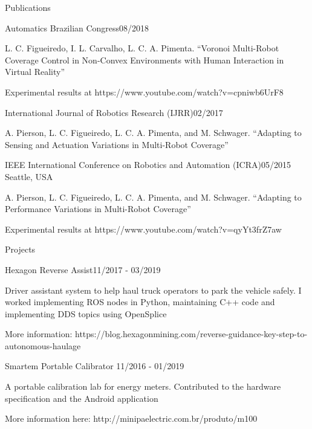 \documentclass[14pt, a4paper]{resume} %
\begin{document}
\begin{rSection}{Publications}
	
\begin{rSubsection}{Automatics Brazilian Congress}{08/2018}{}{}
	
\item L. C. Figueiredo, I. L. Carvalho, L. C. A. Pimenta. ``Voronoi Multi-Robot Coverage Control in Non-Convex Environments with Human Interaction in Virtual Reality''
\item Experimental results at https://www.youtube.com/watch?v=cpniwb6UrF8

\end{rSubsection}	
	
\begin{rSubsection}{International Journal of Robotics Research (IJRR)}{02/2017}{}{}
	
\item A. Pierson, L. C. Figueiredo, L. C. A. Pimenta, and M. Schwager. ``Adapting to Sensing and Actuation Variations in Multi-Robot Coverage''

\end{rSubsection}

\begin{rSubsection}{IEEE International Conference on Robotics and Automation (ICRA)}{05/2015}{}{ \normalfont Seattle, USA}

\item A. Pierson, L. C. Figueiredo, L. C. A. Pimenta, and M. Schwager. ``Adapting to Performance Variations in Multi-Robot Coverage''
\item Experimental results at https://www.youtube.com/watch?v=qyYt3frZ7aw


\end{rSubsection}


\end{rSection}

\begin{rSection}{Projects}
	\begin{rSubsection}{Hexagon Reverse Assist}{11/2017 - 03/2019}{}{}
		\item Driver assistant system to help haul truck operators to park the vehicle safely. I worked implementing ROS nodes in Python, maintaining C++ code and implementing DDS topics using OpenSplice
		\item More information: https://blog.hexagonmining.com/reverse-guidance-key-step-to-autonomous-haulage
	\end{rSubsection}
	
	
	\begin{rSubsection}{Smartem Portable Calibrator	}{11/2016 - 01/2019}{}{}
		\item A portable calibration lab for energy meters. Contributed to the hardware specification and the Android application
		\item More information here: http://minipaelectric.com.br/produto/m100
	\end{rSubsection}
\end{rSection}
\end{document}
